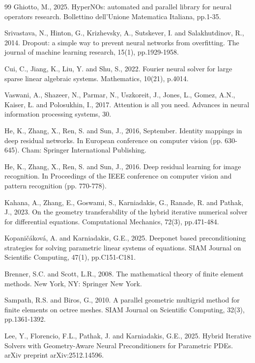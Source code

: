 \documentclass{article}
\theoremstyle{plain}
\numberwithin{equation}{section}
\begin{document}
\begin{thebibliography}{99}
    Ghiotto, M., 2025. HyperNOs: automated and parallel library for neural operators research. Bollettino dell'Unione Matematica Italiana, pp.1-35.

    Srivastava, N., Hinton, G., Krizhevsky, A., Sutskever, I. and Salakhutdinov, R., 2014. Dropout: a simple way to prevent neural networks from overfitting. The journal of machine learning research, 15(1), pp.1929-1958.

    Cui, C., Jiang, K., Liu, Y. and Shu, S., 2022. Fourier neural solver for large sparse linear algebraic systems. Mathematics, 10(21), p.4014.

    Vaswani, A., Shazeer, N., Parmar, N., Uszkoreit, J., Jones, L., Gomez, A.N., Kaiser, Ł. and Polosukhin, I., 2017. Attention is all you need. Advances in neural information processing systems, 30.

    He, K., Zhang, X., Ren, S. and Sun, J., 2016, September. Identity mappings in deep residual networks. In European conference on computer vision (pp. 630-645). Cham: Springer International Publishing.

    He, K., Zhang, X., Ren, S. and Sun, J., 2016. Deep residual learning for image recognition. In Proceedings of the IEEE conference on computer vision and pattern recognition (pp. 770-778).

    Kahana, A., Zhang, E., Goswami, S., Karniadakis, G., Ranade, R. and Pathak, J., 2023. On the geometry transferability of the hybrid iterative numerical solver for differential equations. Computational Mechanics, 72(3), pp.471-484.

    Kopaničáková, A. and Karniadakis, G.E., 2025. Deeponet based preconditioning strategies for solving parametric linear systems of equations. SIAM Journal on Scientific Computing, 47(1), pp.C151-C181.

    Brenner, S.C. and Scott, L.R., 2008. The mathematical theory of finite element methods. New York, NY: Springer New York.

    Sampath, R.S. and Biros, G., 2010. A parallel geometric multigrid method for finite elements on octree meshes. SIAM Journal on Scientific Computing, 32(3), pp.1361-1392.

    Lee, Y., Florencio, F.L., Pathak, J. and Karniadakis, G.E., 2025. Hybrid Iterative Solvers with Geometry-Aware Neural Preconditioners for Parametric PDEs. arXiv preprint arXiv:2512.14596.


\end{thebibliography}
\end{document}
